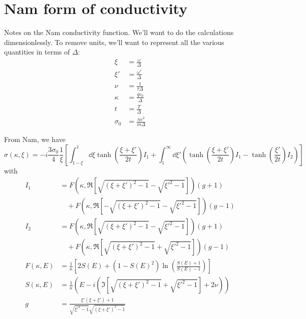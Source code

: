 \documentclass[11pt]{article}
\begin{document}
\section{Nam form of conductivity} \label{sec:NamForm}

Notes on the Nam conductivity function.
We'll want to do the calculations dimensionlessly.
To remove units, we'll want to represent all the various quantities in terms of $\Delta$:
\begin{align}
	\xi &= \frac{\omega}{\Delta} \\
	\xi' &= \frac{\omega'}{\Delta} \\
	\nu &= \frac{1}{\tau \Delta} \\
	\kappa &= \frac{q v_0}{\Delta} \\
	t &= \frac{T}{\Delta} \\
	\sigma_0 &= \frac{n e^2}{m \Delta}
\end{align}

From Nam, we have
\begin{equation}
	\sigma(\kappa, \xi) = -i \frac{3 \sigma_0}{4} \frac{1}{\xi}\left[\int_{1 - \xi}^{1}\dd{\xi} \tanh(\frac{\xi + \xi'}{2 t}) I_1 + \int_{1}^{\infty} \dd{\xi'} \left( \tanh(\frac{\xi + \xi'}{2t}) I_1  - \tanh(\frac{\xi'}{2t})I_2 \right) \right]
\end{equation}
with
\begin{align}
	I_1 &= F(\kappa, \Re[\sqrt{(\xi + \xi')^2 - 1} - \sqrt{\xi'^2 - 1}]) (g + 1) \nonumber\\
	&\quad + F(\kappa, \Re[-\sqrt{(\xi + \xi')^2 - 1} - \sqrt{\xi'^2 - 1}]) (g - 1) \\
	I_2 &= F(\kappa, \Re[\sqrt{(\xi + \xi')^2 - 1} - \sqrt{\xi'^2 - 1}]) (g + 1) \nonumber\\
	&\quad + F(\kappa, \Re[\sqrt{(\xi + \xi')^2 - 1} + \sqrt{\xi'^2 - 1}]) (g - 1) \\
	F(\kappa, E) &= \frac{1}{\kappa} \left[2 S(E) + (1 - S(E)^2)\ln(\frac{S(E) + 1}{S(E) - 1})\right]  \\
	S(\kappa, E) &= \frac{1}{\kappa} \left(E - i \left(\Im[\sqrt{(\xi + \xi')^2 - 1} + \sqrt{\xi'^2 - 1}] + 2 \nu \right) \right) \\
	g  &= \frac{\xi' \left( \xi + \xi'\right) + 1}{\sqrt{\xi'^2 - 1}\sqrt{(\xi + \xi')^2 - 1}}
\end{align}
\end{document}
